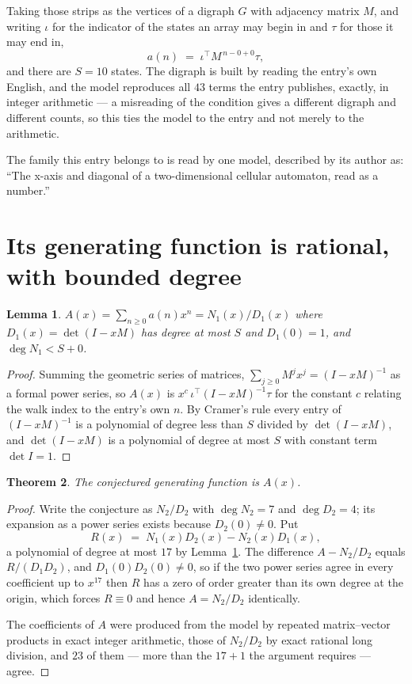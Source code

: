\documentclass[11pt,a4paper]{article}
\theoremstyle{plain}
\newtheorem{theorem}{Theorem}
\newtheorem{lemma}[theorem]{Lemma}
\theoremstyle{definition}
\begin{document}
Taking those strips as the vertices of a digraph $G$ with adjacency matrix $M$, and writing
$\iota$ for the indicator of the states an array may begin in and $\tau$ for those it may end
in,
\[
a(n)\;=\;\iota^{\!\top}M^{\,n-0+0}\tau ,
\]
and there are $S=10$ states. The digraph is built by reading the entry's own English, and the
model reproduces all $43$ terms the entry publishes, exactly, in integer arithmetic --- a
misreading of the condition gives a different digraph and different counts, so this ties the
model to the entry and not merely to the arithmetic.

The family this entry belongs to is read by one model, described by its author as: ``The x-axis and diagonal of a two-dimensional cellular automaton, read as a number.''


\section{Its generating function is rational, with bounded degree}

\begin{lemma}\label{lem:rat}
$A(x)=\sum_{n\ge0}a(n)x^n=N_1(x)/D_1(x)$ where $D_1(x)=\det(I-xM)$ has degree at most
$S$ and $D_1(0)=1$, and $\deg N_1<S+0$.
\end{lemma}

\begin{proof}
Summing the geometric series of matrices, $\sum_{j\ge0}M^jx^j=(I-xM)^{-1}$ as a formal
power series, so $A(x)$ is $x^{c}\,\iota^{\!\top}(I-xM)^{-1}\tau$ for the constant $c$
relating the walk index to the entry's own $n$. By Cramer's rule every entry of
$(I-xM)^{-1}$ is a polynomial of degree less than $S$ divided by $\det(I-xM)$, and
$\det(I-xM)$ is a polynomial of degree at most $S$ with constant term $\det I=1$.
\end{proof}

\begin{theorem}
The conjectured generating function is $A(x)$.
\end{theorem}

\begin{proof}
Write the conjecture as $N_2/D_2$ with $\deg N_2=7$ and $\deg D_2=4$; its expansion as a
power series exists because $D_2(0)\neq0$. Put
\[
R(x)\;=\;N_1(x)D_2(x)-N_2(x)D_1(x),
\]
a polynomial of degree at most $17$ by Lemma~\ref{lem:rat}. The difference
$A-N_2/D_2$ equals $R/(D_1D_2)$, and $D_1(0)D_2(0)\neq0$, so if the two power series agree in
every coefficient up to $x^{17}$ then $R$ has a zero of order greater than its own
degree at the origin, which forces $R\equiv0$ and hence $A=N_2/D_2$ identically.

The coefficients of $A$ were produced from the model by repeated matrix--vector products in
exact integer arithmetic, those of $N_2/D_2$ by exact rational long division, and $23$
of them --- more than the $17+1$ the argument requires --- agree.
\end{proof}
\end{document}
